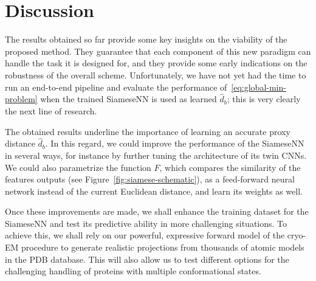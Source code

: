 \section{Discussion}
\label{sec:discussion}

The results obtained so far provide some key insights on the viability of the proposed method. They guarantee that each component of this new paradigm can handle the task it is designed for, and they provide some early indications on the robustness of the overall scheme. Unfortunately, we have not yet had the time to run an end-to-end pipeline and evaluate the performance of~\eqref{eq:global-min-problem} when the trained SiameseNN is used as learned $\widehat{d}_b$; this is very clearly the next line of research.

The obtained results underline the importance of learning an accurate proxy distance $\widehat{d}_b$. In this regard, we could improve the performance of the SiameseNN in several ways, for instance by further tuning the architecture of its twin CNNs. We could also parametrize the function $F$, which compares the similarity of the features outputs (see Figure~\ref{fig:siamese-schematic}), as a feed-forward neural network instead of the current Euclidean distance, and learn its weights as well.

Once these improvements are made, we shall enhance the training dataset for the SiameseNN and test its predictive ability in more challenging situations. To achieve this, we shall rely on our powerful, expressive forward model of the cryo-EM procedure to generate realistic projections from thousands of atomic models in the PDB database. This will also allow us to test different options for the challenging handling of proteins with multiple conformational states.

